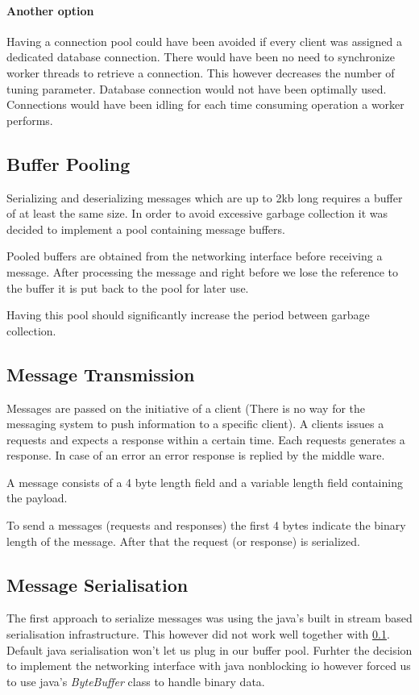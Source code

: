\documentclass[milestone1.tex]{subfiles}
\begin{document}
\paragraph{Another option}
Having a connection pool could have been avoided if every client was assigned a dedicated database connection. There would have been no need to synchronize worker threads to retrieve a connection. This however decreases the number of tuning parameter. Database connection would not have been optimally used. Connections would have been idling for each time consuming operation a worker performs.

\subsection{Buffer Pooling}
\label{sub:buffer-pooling}
Serializing and deserializing messages which are up to 2kb long requires a buffer of at least the same size. In order to avoid excessive garbage collection it was decided to implement a pool containing message buffers.

Pooled buffers are obtained from the networking interface before receiving a message. After processing the message and right before we lose the reference to the buffer it is put back to the pool for later use.

Having this pool should significantly increase the period between garbage collection.

\subsection{Message Transmission}
Messages are passed on the initiative of a client (There is no way for the messaging system to push information to a specific client). A clients issues a requests and expects a response within a certain time. Each requests generates a response. In case of an error an error response is replied by the middle ware.

A message consists of a 4 byte length field and a variable length field containing the payload.

To send a messages (requests and responses) the first 4 bytes indicate the binary length of the message. After that the request (or response) is serialized.

\subsection{Message Serialisation}

The first approach to serialize messages was using the java's built in stream based serialisation infrastructure. This however did not work well together with \ref{sub:buffer-pooling}. Default java serialisation won't let us plug in our buffer pool. Furhter the decision to implement the networking interface with java nonblocking io however forced us to use java's \textit{ByteBuffer} class to handle binary data.
\end{document}
